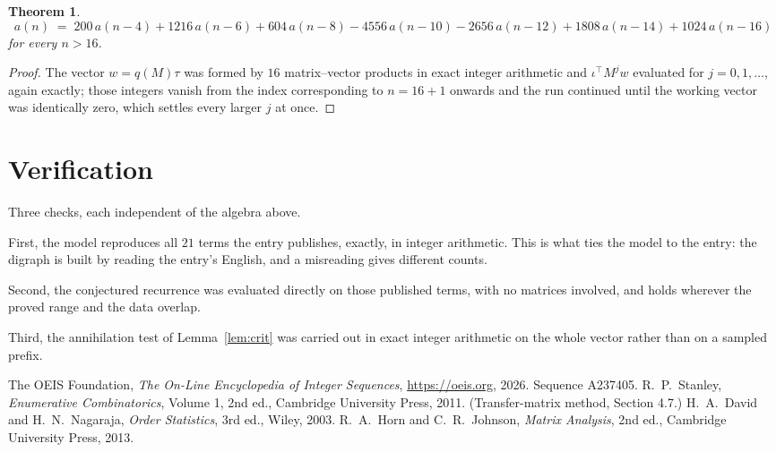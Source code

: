 \documentclass[11pt,a4paper]{article}
\theoremstyle{plain}
\newtheorem{theorem}{Theorem}
\theoremstyle{definition}
\begin{document}
\begin{theorem}
\[
a(n)\;=\;200\,a(n-4) + 1216\,a(n-6) + 604\,a(n-8) - 4556\,a(n-10) - 2656\,a(n-12) + 1808\,a(n-14) + 1024\,a(n-16)
\]
for every $n>16$.
\end{theorem}

\begin{proof}
The vector $w=q(M)\tau$ was formed by $16$ matrix--vector products in exact integer
arithmetic and $\iota^{\!\top}M^{j}w$ evaluated for $j=0,1,\dots$, again exactly; those
integers vanish from the index corresponding to $n=16+1$ onwards and the run continued
until the working vector was identically zero, which settles every larger $j$ at once.
\end{proof}

\section{Verification}

Three checks, each independent of the algebra above.

First, the model reproduces all $21$ terms the entry publishes, exactly, in integer
arithmetic. This is what ties the model to the entry: the digraph is built by reading the
entry's English, and a misreading gives different counts.

Second, the conjectured recurrence was evaluated directly on those published terms, with no
matrices involved, and holds wherever the proved range and the data overlap.

Third, the annihilation test of Lemma~\ref{lem:crit} was carried out in exact integer
arithmetic on the whole vector rather than on a sampled prefix.

\begin{thebibliography}{9}
 The OEIS Foundation, \emph{The On-Line Encyclopedia of Integer
Sequences}, \url{https://oeis.org}, 2026. Sequence A237405.
 R.~P.~Stanley, \emph{Enumerative Combinatorics}, Volume 1, 2nd ed.,
Cambridge University Press, 2011. (Transfer-matrix method, Section 4.7.)
 H.~A.~David and H.~N.~Nagaraja, \emph{Order Statistics}, 3rd ed., Wiley,
2003.
 R.~A.~Horn and C.~R.~Johnson, \emph{Matrix Analysis}, 2nd ed., Cambridge
University Press, 2013.
\end{thebibliography}
\end{document}
